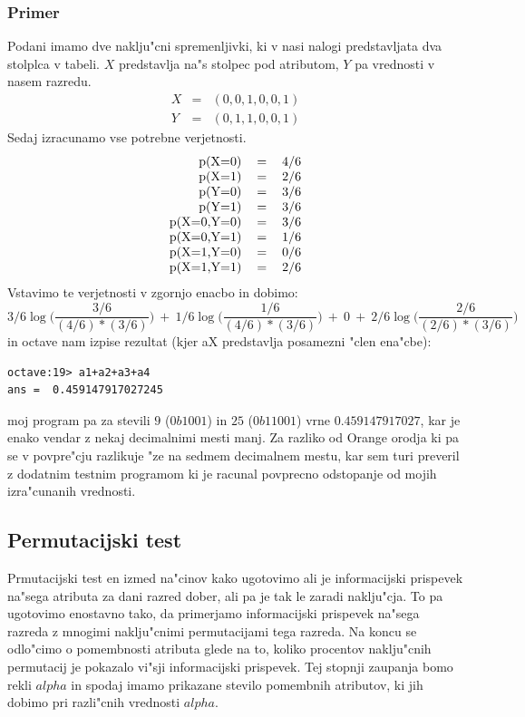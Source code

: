 \documentclass[a4paper,11pt]{article}
\begin{document}
\subsubsection*{Primer}
Podani imamo dve naklju"cni spremenljivki, ki v nasi nalogi predstavljata dva stolplca v tabeli. $X$ predstavlja na"s stolpec pod atributom, $Y$ pa vrednosti v nasem razredu.
\[
 \begin{matrix}
  X & = & (0,0,1,0,0,1) \\
  Y & = & (0,1,1,0,0,1)
 \end{matrix}
\]
Sedaj izracunamo vse potrebne verjetnosti.
\[
\begin{tabular}{rcl}
  p(X=0) & = & 4/6 \\
  p(X=1) & = & 2/6 \\
  p(Y=0) & = & 3/6 \\
  p(Y=1) & = & 3/6 \\
  p(X=0,Y=0) & = & 3/6 \\
  p(X=0,Y=1) & = & 1/6 \\
  p(X=1,Y=0) & = & 0/6 \\
  p(X=1,Y=1) & = & 2/6 \\
\end{tabular} 
\]
Vstavimo te verjetnosti v zgornjo enacbo in dobimo:
\[ 3/6 \log \Bigg(\frac{3/6}{(4/6)*(3/6)}\Bigg)\ +\ 1/6 \log \Bigg(\frac{1/6}{(4/6)*(3/6)}\Bigg)\ +\ 0 \ +\ 2/6 \log \Bigg(\frac{2/6}{(2/6)*(3/6)}\Bigg)\]
in octave nam izpise rezultat (kjer aX predstavlja posamezni "clen ena"cbe):
\begin{verbatim}
octave:19> a1+a2+a3+a4
ans =  0.459147917027245
\end{verbatim}
moj program pa za stevili $9$ ($0b1001$) in $25$ ($0b11001$) vrne $0.459147917027$, kar je enako vendar z nekaj decimalnimi mesti manj. Za razliko od Orange orodja ki pa se v povpre"cju razlikuje "ze na sedmem decimalnem mestu, kar sem turi preveril z dodatnim testnim programom ki je racunal povprecno odstopanje od mojih izra"cunanih vrednosti.

\subsection{Permutacijski test}

Prmutacijski test en izmed na"cinov kako ugotovimo ali je informacijski prispevek na"sega atributa za dani razred dober, ali pa je tak le zaradi naklju"cja. To pa ugotovimo enostavno tako, da primerjamo informacijski prispevek na"sega razreda z mnogimi naklju"cnimi permutacijami tega razreda. Na koncu se odlo"cimo o pomembnosti atributa glede na to, koliko procentov naklju"cnih permutacij je pokazalo vi"sji informacijski prispevek. Tej stopnji zaupanja bomo rekli $alpha$ in spodaj imamo prikazane stevilo pomembnih atributov, ki jih dobimo pri razli"cnih vrednosti $alpha$.\\
\end{document}
